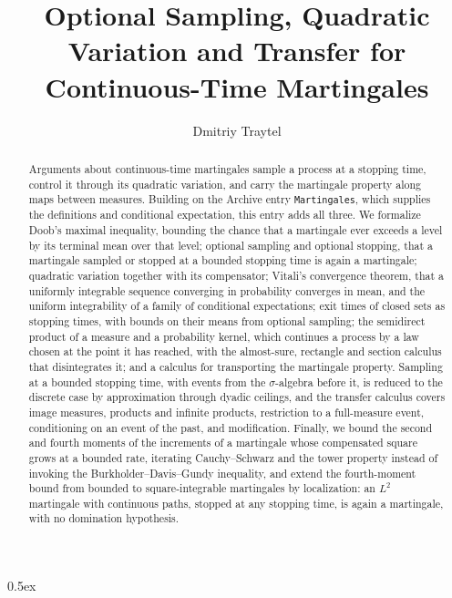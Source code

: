 \documentclass[11pt,a4paper]{article}
\begin{document}
\title{Optional Sampling, Quadratic Variation and Transfer for Continuous-Time Martingales}
\author{Dmitriy Traytel}
\maketitle

\begin{abstract}
  Arguments about continuous-time martingales sample a process at a stopping
  time, control it through its quadratic variation, and carry the martingale
  property along maps between measures.  Building on the Archive entry
  \texttt{Martingales}, which supplies the definitions and conditional
  expectation, this entry adds all three.  We formalize Doob's maximal
  inequality, bounding the chance that a martingale ever exceeds a level by
  its terminal mean over that level; optional sampling and optional stopping,
  that a martingale sampled or stopped at a bounded stopping time is again a
  martingale; quadratic variation together with its compensator; Vitali's
  convergence theorem, that a uniformly integrable sequence converging in
  probability converges in mean, and the uniform integrability of a family
  of conditional expectations; exit times of closed sets as stopping times,
  with bounds on their means from optional sampling; the semidirect product
  of a measure and a probability kernel, which continues a process by a law
  chosen at the point it has reached, with the almost-sure, rectangle and
  section calculus that disintegrates it; and a calculus for transporting
  the martingale property.  Sampling at a
  bounded stopping time, with events from the $\sigma$-algebra before it, is
  reduced to the discrete case by approximation through dyadic ceilings, and the transfer calculus covers image measures,
  products and infinite products, restriction to a full-measure event,
  conditioning on an event of the past, and modification.  Finally, we bound
  the second and fourth moments of the increments of a martingale whose
  compensated square grows at a bounded rate, iterating Cauchy--Schwarz and
  the tower property instead of invoking the Burkholder--Davis--Gundy
  inequality, and extend the fourth-moment bound from bounded to
  square-integrable martingales by localization: an $L^{2}$ martingale with
  continuous paths, stopped at any stopping time, is again a martingale, with
  no domination hypothesis.
\end{abstract}

\tableofcontents

\parindent 0pt\parskip 0.5ex





\end{document}
